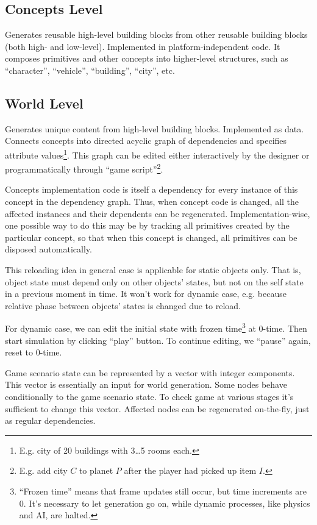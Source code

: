 \documentclass[12pt]{article}
\begin{document}
\subsection{Concepts Level\label{Concept}}

Generates reusable high-level building blocks from other reusable building
blocks (both high- and low-level).
Implemented in platform-independent code.
It composes primitives and other concepts into higher-level structures,
such as ``character'', ``vehicle'', ``building'', ``city'', etc.

\subsection{World Level\label{World}}

Generates unique content from high-level building blocks.
Implemented as data.
Connects concepts into directed acyclic graph of dependencies and specifies
attribute values\footnote{
    E.g. city of 20 buildings with 3\ldots5 rooms each.}.
This graph can be edited either interactively by the designer or
programmatically through ``game script''\footnote{
    E.g. add city \(C\) to planet \(P\) after the player had picked up
    item \(I\).}.

Concepts implementation code is itself a dependency for every
instance of this concept in the dependency graph.
Thus, when concept code is changed, all the affected instances and their
dependents can be regenerated.
Implementation-wise, one possible way to do this may be by tracking
all primitives created by the particular concept, so that when this
concept is changed, all primitives can be disposed automatically.

This reloading idea in general case is applicable for static objects only.
That is, object state must depend only on other objects' states, but
not on the self state in a previous moment in time.
It won't work for dynamic case, e.g. because relative phase between
objects' states is changed due to reload.

For dynamic case, we can edit the initial state with frozen time\footnote{
    ``Frozen time'' means that frame updates still occur, but
    time increments are 0.
    It's necessary to let generation go on, while dynamic processes, like
    physics and AI, are halted.
} at 0-time.
Then start simulation by clicking ``play'' button.
To continue editing, we ``pause'' again, reset to 0-time.

Game scenario state can be represented by a vector with integer components.
This vector is essentially an input for world generation.
Some nodes behave conditionally to the game scenario state.
To check game at various stages it's sufficient to change this vector.
Affected nodes can be regenerated on-the-fly, just as regular dependencies.
\end{document}
